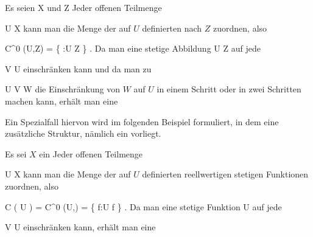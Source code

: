 {





Es seien
\mathkor {} {X} {und} {Z} {}
Jeder offenen Teilmenge

\mavergleichskette
{\vergleichskette
{U
}
{ \subseteq }{ X
}
{  }{
}
{    }{
}
{   }{
}
}
{}{}{}
kann man die Menge der auf $U$ definierten
nach $Z$ zuordnen, also

\mavergleichskettedisp
{\vergleichskette
{ C^0 (U,Z)
}
{ =} { \left\{  \varphi:U \rightarrow Z  \mid   \varphi {}         \right\}
}
{ } {
}
{ } {
}
{ } {
}
}
{}{}{.}
Da man eine stetige Abbildung
\maabb {\varphi} { U } { Z
} {}
auf jede

\mavergleichskette
{\vergleichskette
{V
}
{ \subseteq }{ U
}
{  }{
}
{    }{
}
{   }{
}
}
{}{}{}
einschränken kann und da man zu

\mavergleichskette
{\vergleichskette
{U
}
{ \subseteq }{ V
}
{ \subseteq }{ W
}
{    }{
}
{   }{
}
}
{}{}{}
die Einschränkung von $W$ auf $U$ in einem Schritt oder in zwei Schritten machen kann, erhält man eine





}

Ein Spezialfall hiervon wird im folgenden Beispiel formuliert, in dem eine zusätzliche Struktur, nämlich ein  {} vorliegt.

{





Es sei $X$ ein
Jeder offenen Teilmenge

\mavergleichskette
{\vergleichskette
{U
}
{ \subseteq }{ X
}
{  }{
}
{    }{
}
{   }{
}
}
{}{}{}
kann man die Menge der auf $U$ definierten reellwertigen stetigen Funktionen zuordnen, also

\mavergleichskettedisp
{\vergleichskette
{ { \mathcal  C   }  \left(   U   \right)
}
{ =} { C^0 (U,\R)
}
{ =} { \left\{  f:U \rightarrow \R  \mid  f          \right\}
}
{ } {
}
{ } {
}
}
{}{}{.}
Da man eine stetige Funktion
 { U } { \R
} {}
auf jede

\mavergleichskette
{\vergleichskette
{V
}
{ \subseteq }{ U
}
{  }{
}
{    }{
}
{   }{
}
}
{}{}{}
einschränken kann, erhält man eine





}

